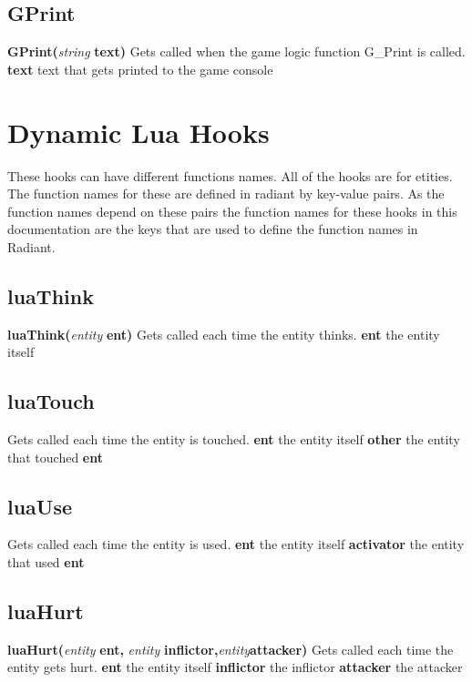 \documentclass{scrreprt}
\begin{document}
\subsection{GPrint}
\label{g-print}
\textbf{GPrint(}\textit{string}\textbf{ text)}
\newline
Gets called when the game logic function G\_Print is called.
\newline
\textbf{text} text that gets printed to the game console
\newpage
\section{Dynamic Lua Hooks}
\label{dyn-lh}
These hooks can have different functions names. All of the hooks are for etities. The function names for these are defined in radiant by key-value pairs.
As the function names depend on these pairs the function names for these hooks in this documentation are the keys that are used to define the function names in Radiant.
\subsection{luaThink}
\label{luaThink}
\textbf{luaThink(}\textit{entity}\textbf{ ent)}
\newline
Gets called each time the entity thinks.
\newline
\textbf{ent} the entity itself
\subsection{luaTouch}
\label{luaTouch}
Gets called each time the entity is touched.
\newline
\textbf{ent} the entity itself
\newline
\textbf{other} the entity that touched \textbf{ent}
\subsection{luaUse}
\label{luaUse}
Gets called each time the entity is used.
\newline
\textbf{ent} the entity itself
\newline
\textbf{activator} the entity that used \textbf{ent}
\subsection{luaHurt}
\label{luaHurt}
\textbf{luaHurt(}\textit{entity}\textbf{ ent, }\textit{entity}\textbf{ inflictor,}\textit{entity}\textbf{attacker)}
\newline
Gets called each time the entity gets hurt.
\newline
\textbf{ent} the entity itself
\newline
\textbf{inflictor} the inflictor
\newline
\textbf{attacker} the attacker
\end{document}

